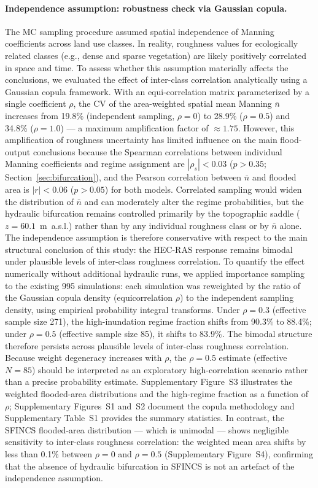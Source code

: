 \documentclass[review,12pt]{elsarticle}
\newcommand{\sfincs}{\textsc{SFINCS}}
\newcommand{\hecras}{\textsc{HEC-RAS}}
\begin{document}
\paragraph{Independence assumption: robustness check via Gaussian copula.}
The MC sampling procedure assumed spatial independence of Manning coefficients
across land use classes.
In reality, roughness values for ecologically related classes (e.g., dense
and sparse vegetation) are likely positively correlated in space and time.
To assess whether this assumption materially affects the conclusions, we
evaluated the
effect of inter-class correlation analytically using a Gaussian copula
framework.
With an equi-correlation matrix parameterized by a single coefficient $\rho$,
the CV of the area-weighted spatial mean Manning $\bar{n}$ increases from
19.8\% (independent sampling, $\rho = 0$) to 28.9\% ($\rho = 0.5$) and
34.8\% ($\rho = 1.0$) --- a maximum amplification factor of $\approx 1.75$.
However, this amplification of roughness uncertainty has limited influence on
the main flood-output conclusions because the Spearman correlations between individual Manning
coefficients and regime assignment are $|\rho_s| < 0.03$ ($p > 0.35$;
Section~\ref{sec:bifurcation}), and the Pearson correlation between $\bar{n}$
and flooded area is $|r| < 0.06$ ($p > 0.05$) for both models.
Correlated sampling would widen the distribution of $\bar{n}$ and can
moderately alter the regime probabilities, but the hydraulic bifurcation
remains controlled primarily by the topographic saddle
($z = 60.1$~m~a.s.l.) rather than by any individual roughness class or
by $\bar{n}$ alone.
The independence assumption is therefore conservative with respect to
the main structural conclusion of this study: the \hecras{} response
remains bimodal under plausible levels of inter-class roughness
correlation.
To quantify the effect numerically without additional hydraulic runs, we
applied importance sampling to the existing 995 simulations: each
simulation was reweighted by the ratio of the Gaussian copula density
(equicorrelation $\rho$) to the independent sampling density, using
empirical probability integral transforms.
Under $\rho = 0.3$ (effective sample size 271), the high-inundation
regime fraction shifts from 90.3\% to 88.4\%; under $\rho = 0.5$
(effective sample size 85), it shifts to 83.9\%.
The bimodal structure therefore persists across plausible levels of
inter-class roughness correlation.
Because weight degeneracy increases with $\rho$, the $\rho = 0.5$ estimate
(effective $N = 85$) should be interpreted as an exploratory high-correlation
scenario rather than a precise probability estimate.
Supplementary Figure~S3 illustrates the weighted flooded-area distributions
and the high-regime fraction as a function of~$\rho$;
Supplementary Figures~S1 and~S2 document the copula methodology and
Supplementary Table~S1 provides the summary statistics.
In contrast, the \sfincs{} flooded-area distribution --- which is unimodal ---
shows negligible sensitivity to inter-class roughness correlation:
the weighted mean area shifts by less than 0.1\% between $\rho = 0$
and $\rho = 0.5$ (Supplementary Figure~S4), confirming that the absence
of hydraulic bifurcation in \sfincs{} is not an artefact of the
independence assumption.
\end{document}
